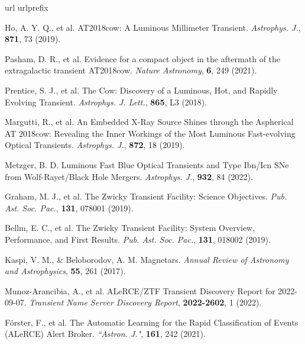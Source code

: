 \documentclass{nature_plusfigure}
\newcommand{\aj}{{``Astron. J."}}
\newcommand{\apj}{{Astrophys. J.}}
\newcommand{\apjl}{{Astrophys. J. Lett.}}
\newcommand{\pasp}{{Pub. Ast. Soc. Pac.}}
\newcommand{\araa}{Annual Review of Astronomy and Astrophysics}
\begin{document}
\clearpage


%
%

\begin{thebibliography}{100}
\expandafter\ifx\csname url\endcsname\relax
  \def\url#1{\texttt{#1}}\fi
\expandafter\ifx\csname urlprefix\endcsname\relax\def\urlprefix{URL }\fi
\providecommand{\bibinfo}[2]{#2}
\providecommand{\eprint}[2][]{\url{#2}}


 Ho, A. Y. Q., et al. AT2018cow: A Luminous Millimeter Transient. \emph{\apj}, \textbf{871}, 73 (2019). 

 Pasham, D. R., et al. Evidence for a compact object in the aftermath of the extragalactic transient AT2018cow. \emph{Nature Astronomy}, \textbf{6}, 249 (2021). 

 Prentice, S. J., et al. The Cow: Discovery of a Luminous, Hot, and Rapidly Evolving Transient. \emph{\apjl}, \textbf{865}, L3 (2018). 

 Margutti, R., et al. An Embedded X-Ray Source Shines through the Aspherical AT 2018cow: Revealing the Inner Workings of the Most Luminous Fast-evolving Optical Transients. \emph{\apj}, \textbf{872}, 18 (2019). 

 Metzger, B. D. Luminous Fast Blue Optical Transients and Type Ibn/Icn SNe from Wolf-Rayet/Black Hole Mergers. \emph{\apj}, \textbf{932}, 84 (2022). 

 Graham, M. J., et al. The Zwicky Transient Facility: Science Objectives. \emph{\pasp}, \textbf{131}, 078001 (2019). 

 Bellm, E. C., et al. The Zwicky Transient Facility: System Overview, Performance, and First Results. \emph{\pasp}, \textbf{131}, 018002 (2019). 

 Kaspi, V. M., \& Beloborodov, A. M. Magnetars. \emph{\araa}, \textbf{55}, 261 (2017). 

 Munoz-Arancibia, A., et al. ALeRCE/ZTF Transient Discovery Report for 2022-09-07. \emph{Transient Name Server Discovery Report}, \textbf{2022-2602}, 1 (2022). 

 Förster, F., et al. The Automatic Learning for the Rapid Classification of Events (ALeRCE) Alert Broker. \emph{\aj}, \textbf{161}, 242 (2021). 


\end{thebibliography}
\end{document}
